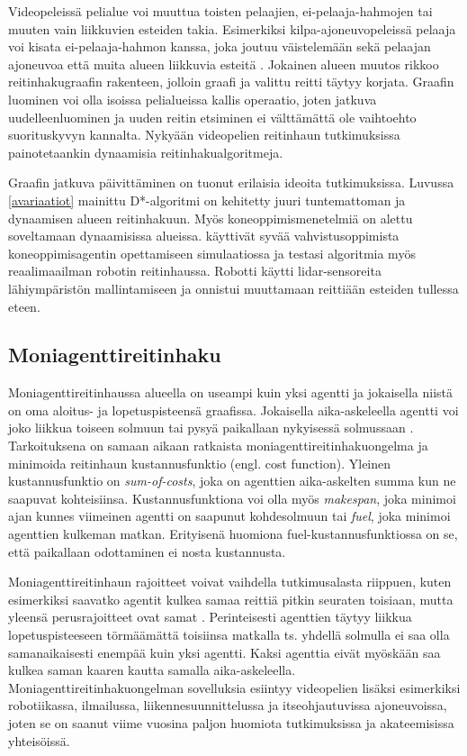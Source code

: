 \documentclass[utf8]{gradu3}
\begin{document}
Videopeleissä pelialue voi muuttua toisten pelaajien, ei-pelaaja-hahmojen tai muuten vain liikkuvien esteiden takia. Esimerkiksi kilpa-ajoneuvopeleissä pelaaja voi kisata ei-pelaaja-hahmon kanssa, joka joutuu väistelemään sekä pelaajan ajoneuvoa että muita alueen liikkuvia esteitä \parencite{sazaki2017pathfinding}. Jokainen alueen muutos rikkoo reitinhakugraafin rakenteen, jolloin graafi ja valittu reitti täytyy korjata. Graafin luominen voi olla isoissa pelialueissa kallis operaatio, joten jatkuva uudelleenluominen ja uuden reitin etsiminen ei välttämättä ole vaihtoehto suorituskyvyn kannalta. Nykyään videopelien reitinhaun tutkimuksissa painotetaankin dynaamisia reitinhakualgoritmeja.

Graafin jatkuva päivittäminen on tuonut erilaisia ideoita tutkimuksissa. Luvussa \ref{avariaatiot} mainittu D*-algoritmi on kehitetty juuri tuntemattoman ja dynaamisen alueen reitinhakuun. Myös koneoppimismenetelmiä on alettu soveltamaan dynaamisissa alueissa. \textcite{lei2018dynamic} käyttivät syvää vahvistusoppimista koneoppimisagentin opettamiseen simulaatiossa ja testasi algoritmia myös reaalimaailman robotin reitinhaussa. Robotti käytti lidar-sensoreita lähiympäristön mallintamiseen ja onnistui muuttamaan reittiään esteiden tullessa eteen.

\subsection{Moniagenttireitinhaku}

Moniagenttireitinhaussa alueella on useampi kuin yksi agentti ja jokaisella niistä on oma aloitus- ja lopetuspisteensä graafissa. Jokaisella aika-askeleella agentti voi joko liikkua toiseen solmuun tai pysyä paikallaan nykyisessä solmussaan \parencite{sharon2015conflict,stern2019multi}. Tarkoituksena on samaan aikaan ratkaista moniagenttireitinhakuongelma ja minimoida reitinhaun kustannusfunktio (engl. cost function). Yleinen kustannusfunktio on \textit{sum-of-costs}, joka on agenttien aika-askelten summa kun ne saapuvat kohteisiinsa. Kustannusfunktiona voi olla myös \textit{makespan}, joka minimoi ajan kunnes viimeinen agentti on saapunut kohdesolmuun tai \textit{fuel}, joka minimoi agenttien kulkeman matkan. Erityisenä huomiona fuel-kustannusfunktiossa on se, että paikallaan odottaminen ei nosta kustannusta.

Moniagenttireitinhaun rajoitteet voivat vaihdella tutkimusalasta riippuen, kuten esimerkiksi saavatko agentit kulkea samaa reittiä pitkin seuraten toisiaan, mutta yleensä perusrajoitteet ovat samat \parencite{sharon2015conflict,stern2019multi}. Perinteisesti agenttien täytyy liikkua lopetuspisteeseen törmäämättä toisiinsa matkalla ts. yhdellä solmulla ei saa olla samanaikaisesti enempää kuin yksi agentti. Kaksi agenttia eivät myöskään saa kulkea saman kaaren kautta samalla aika-askeleella. Moniagenttireitinhakuongelman sovelluksia esiintyy videopelien lisäksi esimerkiksi robotiikassa, ilmailussa, liikennesuunnittelussa ja itseohjautuvissa ajoneuvoissa, joten se on saanut viime vuosina paljon huomiota tutkimuksissa ja akateemisissa yhteisöissä.
\end{document}
